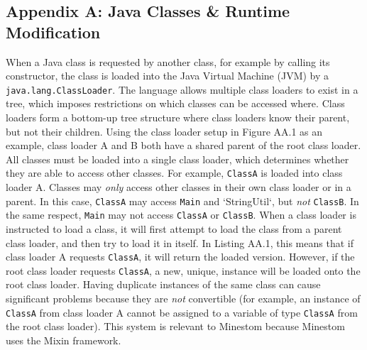 \documentclass{article}
\def\code#1{\texttt{#1}}
\begin{document}
\printbibliography

\begin{onehalfspacing}

\section{Appendix A: Java Classes \& Runtime Modification}

When a Java class is requested by another class, for example by calling
its constructor, the class is loaded into the Java Virtual Machine (JVM)
by a \code{java.lang.ClassLoader}. The language allows multiple class loaders
to exist in a tree, which imposes restrictions on which classes can be
accessed where. Class loaders form a bottom-up tree structure where
class loaders know their parent, but not their children. Using the class
loader setup in Figure AA.1 as an example, class loader A and B both
have a shared parent of the root class loader. All classes must be
loaded into a single class loader, which determines whether they are
able to access other classes. For example, \code{ClassA} is loaded into class
loader A. Classes may \emph{only} access other classes in their own class
loader or in a parent. In this case, \code{ClassA} may access \code{Main} and
`StringUtil`, but \emph{not} \code{ClassB}. In the same respect, \code{Main} may 
not access \code{ClassA} or \code{ClassB}. When a class loader is instructed to 
load a class, it will first attempt to load the class from a parent class
loader, and then try to load it in itself. In Listing AA.1, this means
that if class loader A requests \code{ClassA}, it will return the loaded
version. However, if the root class loader requests \code{ClassA}, a new,
unique, instance will be loaded onto the root class loader. Having
duplicate instances of the same class can cause significant problems
because they are \emph{not} convertible (for example, an instance of
\code{ClassA} from class loader A cannot be assigned to a variable of type
\code{ClassA} from the root class loader). This system is relevant to
Minestom because Minestom uses the Mixin framework.


\end{onehalfspacing}
\end{document}
